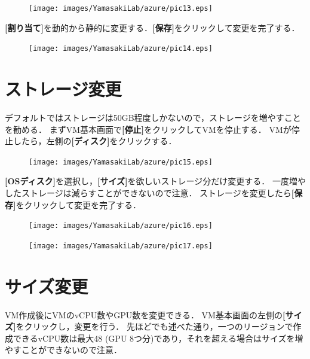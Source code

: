\begin{figure}[ht]
	\begin{center}
		\texttt{[image: images/YamasakiLab/azure/pic13.eps]}
	\end{center}
\end{figure}

{\bf[割り当て]}を動的から静的に変更する．{\bf[保存]}をクリックして変更を完了する．

\begin{figure}[ht]
	\begin{center}
		\texttt{[image: images/YamasakiLab/azure/pic14.eps]}
	\end{center}
\end{figure}

\newpage

\section*{ストレージ変更}
デフォルトではストレージは50GB程度しかないので，ストレージを増やすことを勧める．
まずVM基本画面で{\bf[停止]}をクリックしてVMを停止する．
VMが停止したら，左側の{\bf[ディスク]}をクリックする．

\begin{figure}[ht]
	\begin{center}
		\texttt{[image: images/YamasakiLab/azure/pic15.eps]}
	\end{center}
\end{figure}

{\bf[OSディスク]}を選択し，{\bf[サイズ]}を欲しいストレージ分だけ変更する．
一度増やしたストレージは減らすことができないので注意．
ストレージを変更したら{\bf[保存]}をクリックして変更を完了する．

\begin{figure}[ht]
	\begin{center}
		\texttt{[image: images/YamasakiLab/azure/pic16.eps]}
	\end{center}
\end{figure}

\begin{figure}[ht]
	\begin{center}
		\texttt{[image: images/YamasakiLab/azure/pic17.eps]}
	\end{center}
\end{figure}

\newpage

\section*{サイズ変更}
VM作成後にVMのvCPU数やGPU数を変更できる．
VM基本画面の左側の{\bf[サイズ]}をクリックし，変更を行う．
先ほどでも述べた通り，一つのリージョンで作成できるvCPU数は最大48 (GPU 8つ分)であり，それを超える場合はサイズを増やすことができないので注意．

